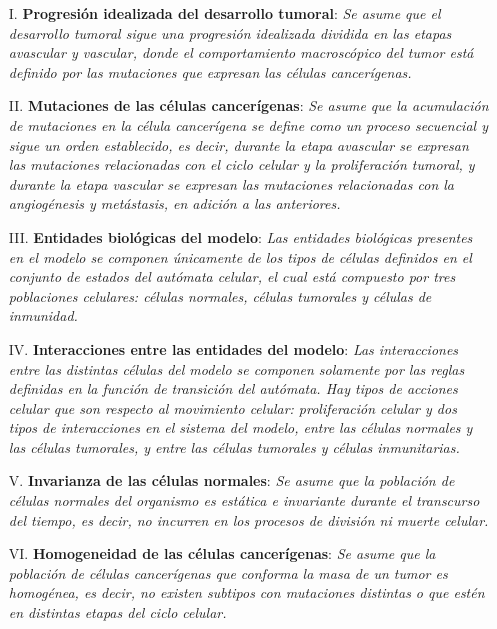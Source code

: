 \begin{enumerate}
\item [{I.}] \textbf{Progresi\'on idealizada del desarrollo tumoral}: \emph{Se asume que el desarrollo tumoral sigue una progresi\'on idealizada dividida en las etapas avascular y vascular, donde el comportamiento macrosc\'opico del tumor est\'a definido por las mutaciones que expresan las c\'elulas cancer\'igenas.} \label{I}

\item [{II.}] \textbf{Mutaciones de las c\'elulas cancer\'igenas}: \emph{Se asume que la acumulaci\'on de mutaciones en la c\'elula cancer\'igena se define como un proceso secuencial y sigue un orden establecido, es decir, durante la etapa avascular se expresan las mutaciones relacionadas con el ciclo celular y la proliferaci\'on tumoral, y durante la etapa vascular se expresan las mutaciones relacionadas con la angiog\'enesis y met\'astasis, en adici\'on a las anteriores.} \label{II}

\item [{III.}] \textbf{Entidades biol\'ogicas del modelo}: \emph{Las entidades biol\'ogicas presentes en el modelo se componen \'unicamente de los tipos de c\'elulas definidos en el conjunto de estados del aut\'omata celular, el cual est\'a compuesto por tres poblaciones celulares: c\'elulas normales, c\'elulas tumorales y c\'elulas de inmunidad.} \label{III}

\item [{IV.}] \textbf{Interacciones entre las entidades del modelo}: \emph{Las interacciones entre las distintas c\'elulas del modelo se componen solamente por las reglas definidas en la funci\'on de transici\'on del aut\'omata. Hay tipos de acciones celular que son respecto al movimiento celular: proliferaci\'on celular y dos tipos de interacciones en el sistema del modelo, entre las c\'elulas normales y las c\'elulas tumorales, y entre las c\'elulas tumorales y c\'elulas inmunitarias.} \label{IV}

\item [{V.}] \textbf{Invarianza de las c\'elulas normales}: \emph{Se asume que la poblaci\'on de c\'elulas normales del organismo es est\'atica e invariante durante el transcurso del tiempo, es decir, no incurren en los procesos de divisi\'on ni muerte celular.} \label{V}

\item [{VI.}] \textbf{Homogeneidad de las c\'elulas cancer\'igenas}: \emph{Se asume que la poblaci\'on de c\'elulas cancer\'igenas que conforma la masa de un tumor es homog\'enea, es decir, no existen subtipos con mutaciones distintas o que est\'en en distintas etapas del ciclo celular.} \label{VI}


\end{enumerate}
